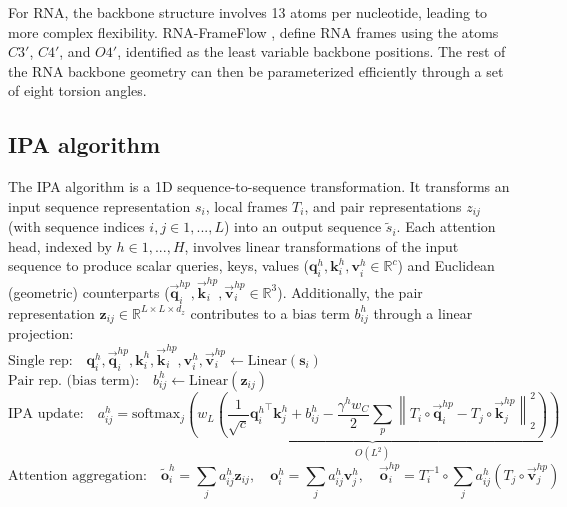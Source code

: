 \documentclass{article}
\begin{document}
For RNA, the backbone structure involves 13 atoms per nucleotide, leading to more complex flexibility. RNA-FrameFlow \cite{anand2024rnaframeflow}, define RNA frames using the atoms $C3'$, $C4'$, and $O4'$, identified as the least variable backbone positions. The rest of the RNA backbone geometry can then be parameterized efficiently through a set of eight torsion angles.

\subsection{IPA algorithm}
The IPA algorithm is a 1D sequence-to-sequence transformation. It transforms an input sequence representation $s_i$, local frames $T_i$, and pair representations $z_{ij}$ (with sequence indices $i,j \in {1,...,L}$) into an output sequence $\tilde{s}_i$. Each attention head, indexed by $h \in {1,...,H}$, involves linear transformations of the input sequence to produce scalar queries, keys, values ($\mathbf{q}_i^h, \mathbf{k}_i^h, \mathbf{v}_i^h \in \mathbb{R}^c$) and Euclidean (geometric) counterparts ($\vec{\mathbf{q}}_i^{hp}, \vec{\mathbf{k}}_i^{hp}, \vec{\mathbf{v}}_i^{hp} \in \mathbb{R}^3$). Additionally, the pair representation $\mathbf{z}_{ij} \in \mathbb{R}^{L\times L \times d_z}$ contributes to a bias term $b_{ij}^h$ through a linear projection:
\begin{equation}
\text{Single rep:} \quad 
\mathbf{q}_i^h, \vec{\mathbf{q}}_i^{hp}, \mathbf{k}_i^h, \vec{\mathbf{k}}_i^{hp}, \mathbf{v}_i^h, \vec{\mathbf{v}}_i^{hp} \leftarrow \textrm{Linear}\left(\mathbf{s}_i\right)  \qquad \qquad \qquad \qquad \qquad \qquad   \qquad \qquad \qquad \qquad   \qquad \qquad 
\label{components}
\end{equation}
\begin{equation}
\text{Pair rep. (bias term):} \quad
b_{ij}^h \leftarrow \textrm{Linear}\left(\mathbf{z}_{ij}\right)  \qquad \qquad \qquad \qquad    \qquad \qquad \qquad \qquad  \qquad \qquad \qquad \qquad    \qquad \qquad  \,  \label{pair}
\end{equation}
\begin{equation}
\text{IPA update:} \quad
a_{ij}^h = \textrm{softmax}_j \underbrace{\left(w_L \left( \frac{1}{\sqrt{c}} {\mathbf{q}_i^h}^\intercal\mathbf{k}_j^h + b_{ij}^h - \frac{\gamma^h w_C}{2} \sum_p {\left\|T_i\circ\vec{\mathbf{q}}_i^{hp} - T_j\circ\vec{\mathbf{k}}_j^{hp}\right\|^2_2}\right)\right)}_{O(L^2)}   \qquad \qquad \qquad \qquad \quad
\label{update}
\end{equation}
\begin{equation}
\text{Attention aggregation:}\quad
\tilde{\mathbf{o}}_i^h = \sum_j{a_{ij}^h\mathbf{z}_{ij}}, \quad 
\mathbf{o}_i^h = \sum_j{a_{ij}^h\mathbf{v}_j^h}, \quad 
\vec{\mathbf{o}}_i^{hp} = T_i^{-1} \circ \sum_j{a_{ij}^h\left(T_j \circ \vec{\mathbf{v}}_j^{hp}\right)} 
\qquad \qquad \qquad \qquad     
\end{equation}
\end{document}
